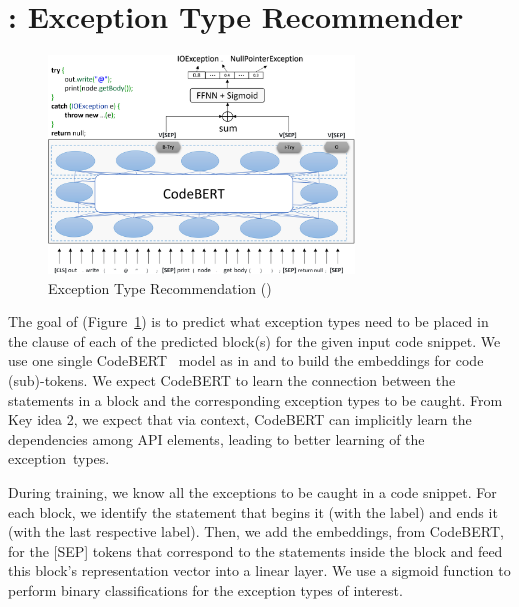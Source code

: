 \section{{\xtype}: Exception Type Recommender}
\label{sec:xtype}

\begin{figure}[t]
\begin{center}
\includegraphics[width=3.2in]{xtype-6.png}
\vspace{-8pt}
\caption{Exception Type Recommendation ({\xtype})}
\label{fig:xtype}
\end{center}
\end{figure}

The goal of {\xtype} (Figure~\ref{fig:xtype}) is to predict what
exception types need to be placed in the  clause of each
of the predicted  block(s) for the given input code
snippet. We use one single CodeBERT~\cite{codebert-emnlp20} model as
in {\xblock} and {\xstate} to build the embeddings for code (sub)-tokens.
%
We expect CodeBERT to learn the connection between the statements in a
 block and the corresponding exception types to be
caught. From Key idea 2, we expect that via context, CodeBERT can
implicitly learn the dependencies among API elements, leading to
better learning of the exception~types.

During training, we know all the exceptions to be caught in a code
snippet. For each  block, we identify the statement
that begins it (with the  label) and ends it (with the
last respective  label). Then, we add the embeddings, from
CodeBERT, for the [SEP] tokens that correspond to the statements
inside the  block and feed this  block's representation vector into a linear layer.
We use a sigmoid function to perform binary classifications for the
exception types of interest.

